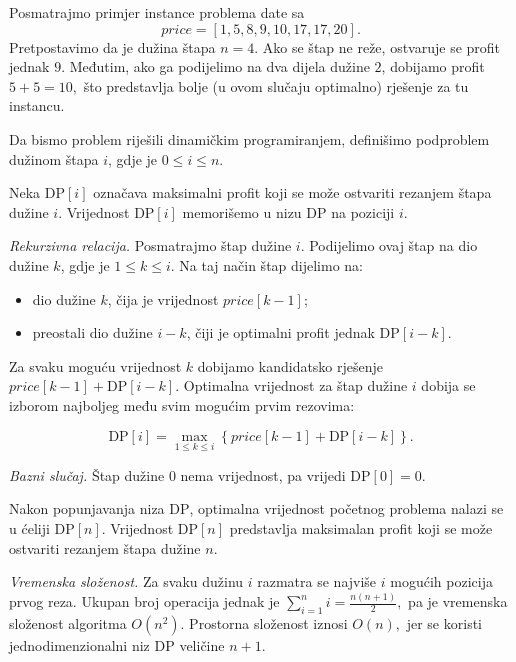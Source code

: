 \begin{solution}
	
	Posmatrajmo primjer instance problema date sa 
	$$price = [1,5,8,9,10,17,17,20].$$ 
	Pretpostavimo da je dužina štapa $n=4.$	Ako se štap ne reže, ostvaruje se profit jednak $9$. Međutim, ako ga podijelimo na dva dijela dužine $2$, dobijamo profit $
	5+5=10,
	$ što predstavlja bolje (u ovom slučaju optimalno) rješenje za tu instancu.
	
	\medskip
	
	Da bismo problem riješili dinamičkim programiranjem, definišimo podproblem dužinom štapa $i$, gdje je $
	0 \leq i \leq n.
	$
	
	Neka $\textrm{DP}[i]$ označava maksimalni profit koji se može ostvariti rezanjem štapa dužine $i$. Vrijednost $\textrm{DP}[i]$ memorišemo u nizu $\textrm{DP}$ na poziciji $i$.
	
	\medskip
	
	\textit{Rekurzivna relacija.} Posmatrajmo štap dužine $i$. Podijelimo ovaj štap na dio dužine $k$, gdje je $ 1 \leq k \leq i.$ Na taj način štap dijelimo na:
	
	\begin{itemize}
		\item dio dužine $k$, čija je vrijednost $price[k-1]$;
		\item preostali dio dužine $i-k$, čiji je optimalni profit jednak $\textrm{DP}[i-k]$.
	\end{itemize}
	
	Za svaku moguću vrijednost $k$ dobijamo kandidatsko rješenje $price[k-1] + \textrm{DP}[i-k].$  Optimalna vrijednost za štap dužine $i$ dobija se izborom najboljeg među svim mogućim prvim rezovima:
	
	$$
	  \textrm{DP}[i] =
	  \max_{1 \leq k \leq i}
	  \left\{
		price[k-1] + \textrm{DP}[i-k]
		\right\}.
	$$
	
	\medskip
	
	\textit{Bazni slučaj.} Štap dužine $0$ nema vrijednost, pa vrijedi $\textrm{DP}[0]=0.$
	
	\medskip
	
	Nakon popunjavanja niza $\textrm{DP}$, optimalna vrijednost početnog problema nalazi se u ćeliji $
	\textrm{DP}[n].$ 	Vrijednost $\textrm{DP}[n]$ predstavlja maksimalan profit koji se može ostvariti rezanjem štapa dužine $n$.
	
	\medskip
	
	\textit{Vremenska složenost.}	Za svaku dužinu $i$ razmatra se najviše $i$ mogućih pozicija prvog reza. Ukupan broj operacija jednak je $	\sum_{i=1}^{n} i =
	\frac{n(n+1)}{2},
	$  pa je vremenska složenost algoritma $O(n^2).$  Prostorna složenost iznosi $O(n),$ jer se koristi jednodimenzionalni niz $\textrm{DP}$ veličine $n+1$.
	
\end{solution}


